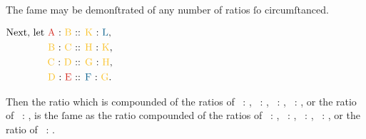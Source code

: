 \documentclass[11pt,preview]{standalone}
\begin{document}
The ſame may be demonſtrated of any number of ratios ſo circumſtanced.

\begin{center}
    $\begin{aligned}\text{Next, let \redA\ : \yellowB\ } & \text{:: \yellowK\ : \blueL},   \\
               \text{\yellowB\ : \yellowC\ }        & \text{:: \yellowH\ : \yellowK}, \\
               \text{\yellowC\ : \yellowD\ }        & \text{:: \yellowG\ : \yellowH}, \\
               \text{\yellowD\ : \redE\ }           & \text{:: \blueF\ : \yellowG}.   \\
        \end{aligned}$
\end{center}

Then the ratio which is compounded of the ratios of \redA\ : \yellowB, \yellowB\ : \yellowC, \yellowC\ : \yellowD, \yellowD\ : \redE, or the ratio of \redA\ : \redE, is the ſame as the ratio compounded of the ratios of \yellowK\ : \blueL, \yellowH\ : \yellowK, \yellowG\ : \yellowH, \blueF\ : \yellowG, or the ratio of \blueF\ : \blueL.
\end{document}
